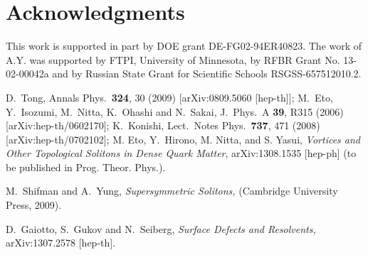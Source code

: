 \documentclass[12pt]{article}
\begin{document}
\section*{Acknowledgments}

This work  is supported in part by DOE grant DE-FG02-94ER40823. 
The work of A.Y. was  supported 
by  FTPI, University of Minnesota, 
by RFBR Grant No. 13-02-00042a 
and by Russian State Grant for 
Scientific Schools RSGSS-657512010.2.

\small
\begin{thebibliography}{99}
\itemsep -2pt

  D.~Tong,
  Annals Phys.\  {\bf 324}, 30 (2009)
  [arXiv:0809.5060 [hep-th]];
  M.~Eto, Y.~Isozumi, M.~Nitta, K.~Ohashi and N.~Sakai,
  J.\ Phys.\ A  {\bf 39}, R315 (2006)
  [arXiv:hep-th/0602170];
  K.~Konishi,
  Lect.\ Notes Phys.\  {\bf 737}, 471 (2008)
  [arXiv:hep-th/0702102];
  M. Eto, Y.~Hirono, M.  Nitta, and S. Yasui,
  {\em Vortices and Other Topological Solitons in Dense Quark Matter},
  arXiv:1308.1535 [hep-ph] (to be published in Prog. Theor. Phys.).

  M.~Shifman and A.~Yung,
{\em Supersymmetric Solitons,}
  (Cambridge University Press, 2009).
  
  D.~Gaiotto, S.~Gukov and N.~Seiberg,
{\em Surface Defects and Resolvents,}
  arXiv:1307.2578 [hep-th].


\end{thebibliography}
\end{document}
